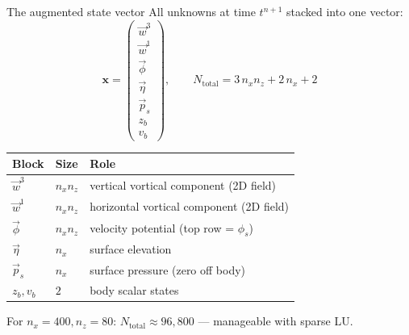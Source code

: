 \documentclass[aspectratio=169, 10pt]{beamer}
\newcommand{\xx}{\mathbf{x}}
\begin{document}
\begin{frame}{The augmented state vector}
\footnotesize All unknowns at time $t^{n+1}$ stacked into one vector:
\[
\xx = \begin{pmatrix} \vec{w}^3 \\ \vec{w}^1 \\ \vec{\phi} \\ \vec{\eta} \\ \vec{p}_s \\ z_b \\ v_b \end{pmatrix},
\qquad
N_{\mathrm{total}} = 3\,n_x n_z + 2\,n_x + 2
\]

\vspace{0.3em}
\begin{center}
\scriptsize
\begin{tabular}{@{}lll@{}}
\toprule
Block & Size & Role \\
\midrule
$\vec{w}^3$ & $n_x n_z$ & vertical vortical component (2D field) \\
$\vec{w}^1$ & $n_x n_z$ & horizontal vortical component (2D field) \\
$\vec{\phi}$ & $n_x n_z$ & velocity potential (top row = $\phi_s$) \\
$\vec{\eta}$ & $n_x$ & surface elevation \\
$\vec{p}_s$ & $n_x$ & surface pressure (zero off body) \\
$z_b, v_b$ & $2$ & body scalar states \\
\bottomrule
\end{tabular}
\end{center}

\vspace{0.4em}
\small For $n_x=400, n_z=80$: $N_{\mathrm{total}} \approx 96{,}800$ — manageable with sparse LU.
\end{frame}
\end{document}
